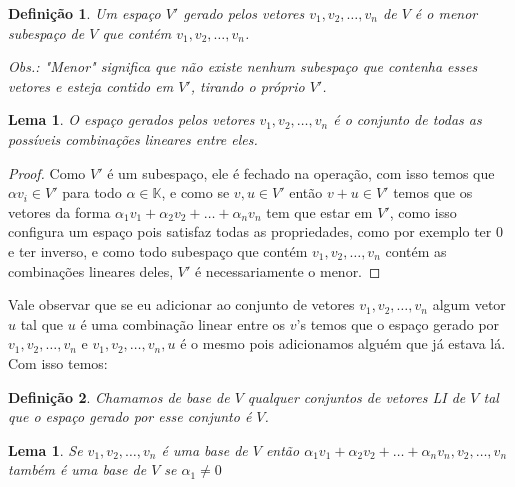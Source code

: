 \documentclass{article}
\newtheorem{lemma}[theorem]{Lema}
\newtheorem{definition}{Definição}[section]
\newcommand{\KK}{\mathbb{K} }
\begin{document}
\begin{definition}
Um espaço $V'$ gerado pelos vetores $v_1,v_2,\dots,v_n$ de $V$ é o menor subespaço de $V$ que contém $v_1,v_2,\dots , v_n$.

Obs.: "Menor" significa que não existe nenhum subespaço que contenha esses vetores e  esteja contido em $V'$, tirando o próprio $V'$.
\end{definition}
    
\begin{lemma}
O espaço gerados pelos vetores $v_1,v_2, \dots, v_n$ é o conjunto de todas as possíveis combinações lineares entre eles.
\end{lemma}

\begin{proof}
Como $V'$ é um subespaço, ele é fechado na operação, com isso temos que $\alpha v_i \in V'$ para todo $\alpha \in \KK$, e como se $v,u \in V'$ então $v+u \in V'$ temos que os vetores da forma $\alpha_1v_1 + \alpha_2v_2 +\dots + \alpha_nv_n$ tem que estar em $V'$, como isso configura um espaço pois satisfaz todas as propriedades, como por exemplo ter 0 e ter inverso, e como todo subespaço que contém $v_1,v_2, \dots, v_n$ contém as combinações lineares deles, $V'$ é necessariamente o menor.
\end{proof}

Vale observar que se eu adicionar ao conjunto de vetores $v_1,v_2, \dots, v_n$ algum vetor $u$ tal que $u$ é uma combinação linear entre os $v$'s temos que o espaço gerado por $v_1,v_2, \dots, v_n$ e $v_1,v_2, \dots, v_n, u$ é o mesmo pois adicionamos alguém que já estava lá. Com isso temos:

\begin{definition}
Chamamos de base de $V$ qualquer conjuntos de vetores LI de $V$ tal que o espaço gerado por esse conjunto é $V$.
\end{definition}

\begin{lemma}
\label{Lema1.3}
Se $v_1,v_2,\dots,v_n$ é uma base de $V$ então $\alpha_1v_1 + \alpha_2v_2 +\dots + \alpha_nv_n, v_2,\dots,v_n $ também é uma base de $V$ se $\alpha_1 \ne 0$
\end{lemma}
\end{document}
